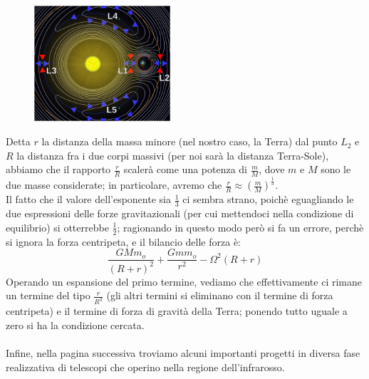 \begin{figure}[h!]
	\centering
	\includegraphics[width=0.45\textwidth]{Img/pti_lagrangiani_grafico.png}
\end{figure}

Detta $r$ la distanza della massa minore (nel nostro caso, la Terra) dal punto $L_2$ e $R$ la distanza fra i due corpi massivi (per noi sarà la distanza Terra-Sole), abbiamo che il rapporto $\frac{r}{R}$ scalerà come una potenza di $\frac{m}{M}$, dove $m$ e $M$ sono le due masse considerate; in particolare, avremo che $\frac{r}{R} \approx \left( \frac{m}{M} \right) ^{\frac{1}{3}}$.\\
Il fatto che il valore dell'esponente sia $\frac{1}{3}$ ci sembra strano, poichè eguagliando le due espressioni delle forze gravitazionali (per cui mettendoci nella condizione di equilibrio) si otterrebbe $\frac{1}{2}$; ragionando in questo modo però si fa un errore, perchè si ignora la forza centripeta, e il bilancio delle forza è:
$$\frac{GMm_o}{(R+r)^2} + \frac{Gmm_o}{r^2} - \Omega^2(R+r)$$
Operando un espansione del primo termine, vediamo che effettivamente ci rimane un termine del tipo $\frac{r}{R^3}$ (gli altri termini si eliminano con il termine di forza centripeta) e il termine di forza di gravità della Terra; ponendo tutto uguale a zero si ha la condizione cercata.
\\
\\
Infine, nella pagina successiva troviamo alcuni importanti progetti in diversa fase realizzativa di telescopi che operino nella regione dell'infrarosso.

